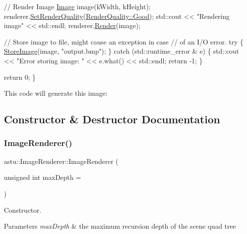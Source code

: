 \begin{DoxyCode}
  \textcolor{comment}{// Render Image }
  \hyperlink{classastu_1_1Image}{Image} image(kWidth, kHeight);
  renderer.\hyperlink{classastu_1_1ImageRenderer_a154491f8ef39881eeaba56f9d8ca24e8}{SetRenderQuality}(\hyperlink{group__gfx__group_ggac3b4955f341cea44f53f8446d734cd54a0c6ad70beb3a7e76c3fc7adab7c46acc}{RenderQuality::Good});
  std::cout << \textcolor{stringliteral}{"Rendering image"} << std::endl;
  renderer.\hyperlink{classastu_1_1ImageRenderer_a55172edcac396d7840da655697d57e28}{Render}(image);

  \textcolor{comment}{// Store image to file, might cause an exception in case}
  \textcolor{comment}{// of an I/O error.}
  \textcolor{keywordflow}{try} \{
    \hyperlink{group__gfx__group_gaca5f9cb8047c60049300242c20d30cd6}{StoreImage}(image, \textcolor{stringliteral}{"output.bmp"});
  \} \textcolor{keywordflow}{catch} (std::runtime\_error & e) \{
    std::cout << \textcolor{stringliteral}{"Error storing image: "} << e.what() << std::endl;
    \textcolor{keywordflow}{return} -1;
  \}

  \textcolor{keywordflow}{return} 0;
\}     
\end{DoxyCode}


This code will generate this image\+:

 

\subsection{Constructor \& Destructor Documentation}
\mbox{\label{classastu_1_1ImageRenderer_ac22ff902eee74bd90e4371609d75aa6a}} 
\subsubsection{\texorpdfstring{Image\+Renderer()}{ImageRenderer()}}
{\footnotesize\ttfamily astu\+::\+Image\+Renderer\+::\+Image\+Renderer (\begin{DoxyParamCaption}\item[{unsigned int}]{max\+Depth = {} }\end{DoxyParamCaption})}

Constructor.


\begin{DoxyParams}{Parameters}
{\em max\+Depth} & the maximum recursion depth of the scene quad tree \\
\hline
\end{DoxyParams}
\mbox{\label{classastu_1_1ImageRenderer_ac35d79e814253e2a2755da114e05d05c}} 
